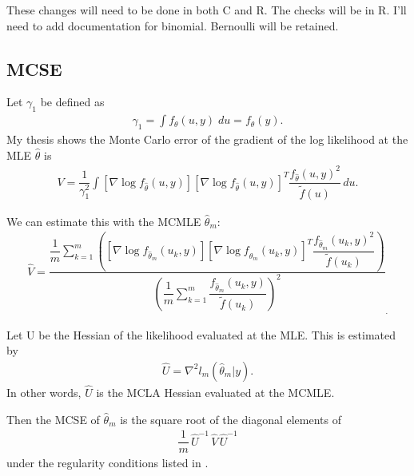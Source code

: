 \documentclass{article}
\begin{document}
These changes will need to be done in both C and R. The checks will be in R. I'll need to add  documentation for binomial. Bernoulli will be retained.


\subsection{MCSE}
Let  $\gamma_1$ be defined as
\begin{align}
  \gamma_1 = \int  f_\theta(u,y) \; du =  f_\theta(y). \label{eq:gamma1} 
\end{align}
My thesis shows the Monte Carlo error of the gradient of the log likelihood at the MLE $\hat{\theta}$ is 
\begin{align}
V= \dfrac{1}{\gamma_1^2}  \int \left[  \nabla \log f_{\hat{\theta}}(u,y)  \right] \left[  \nabla \log f_{\hat{\theta}}(u,y)  \right]^T \dfrac{f_{\hat{\theta}}(u,y)^2}{\tilde{f}(u)} \, du.
\end{align}



We can estimate this with the MCMLE $\hat{\theta}_m$:
\begin{align}
\hat{V}= \dfrac{ \dfrac{1}{m}  \sum_{k=1}^m \left( \left[\nabla \log f_{\hat{\theta}_m}(u_k,y)  \right] \left[\nabla \log f_{\hat{\theta}_m}(u_k,y)  \right]^T  \dfrac{ f_{\hat{\theta}_m}(u_k,y)^2   }{\tilde{f}(u_k)}  \right) }
{  \left( \dfrac{1}{m} \sum_{k=1}^m  \dfrac{ f_{\hat{\theta}_m}(u_k,y)   }{\tilde{f}(u_k)} \right)^2 }_.
\end{align}

Let U be the Hessian of the likelihood evaluated at the MLE. This is estimated by
\begin{align}
\hat{U} = \nabla^2 l_m (\hat{\theta}_m |y).
\end{align}
In other words, $\hat{U}$ is the  MCLA Hessian evaluated at the MCMLE. 

Then the MCSE of $\hat{\theta}_m$ is the square root of the diagonal elements of
\begin{align} 
\dfrac{1}{m} \, \hat{U}^{-1} \, \hat{V} \, \hat{U}^{-1}
\end{align}
under the regularity conditions listed in \citet{geyer:1994}.
\end{document}

